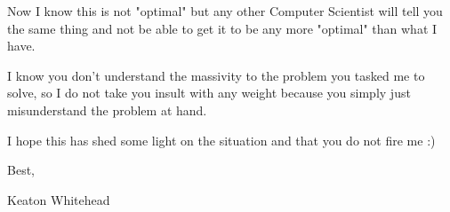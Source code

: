 \documentclass[12pt]{article}
\begin{document}
Now I know this is not "optimal" but any other Computer Scientist will tell you the same thing and not be able to get it to be any more "optimal" than what I have.

I know you don't understand the massivity to the problem you tasked me to solve, so I do not take you insult with any weight because you simply just misunderstand the problem at hand.

I hope this has shed some light on the situation and that you do not fire me :)

Best,

Keaton Whitehead

\newpage
\mbox{}
\newpage
\pagebreak
\end{document}

